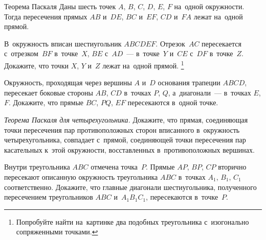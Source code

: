 


\begin{claim}{Теорема Паскаля}
Даны шесть точек $A$, $B$, $C$, $D$, $E$, $F$ на~одной окружности.
Тогда пересечения прямых $AB$ и~$DE$, $BC$ и~$EF$, $CD$ и~$FA$ лежат на~одной
прямой.
\end{claim}

\begin{problems}

\item
В~окружность вписан шестиугольник $ABCDEF$.
Отрезок~$AC$ пересекается с~отрезком~$BF$ в~точке~$X$,
$BE$ с~$AD$~--- в~точке~$Y$ и~$CE$ с~$DF$ в~точке~$Z$.
Докажите, что точки $X$, $Y$ и~$Z$ лежат на~одной прямой.%
\footnote{Попробуйте найти на~картинке два подобных треугольника с~изогонально
сопряженными точками.}


\item
Окружность, проходящая через вершины $A$ и~$D$ основания трапеции $ABCD$,
пересекает боковые стороны $AB$, $CD$ в~точках $P$, $Q$, а~диагонали~---
в~точках $E$, $F$.
Докажите, что прямые $BC$, $PQ$, $EF$ пересекаются в~одной точке.


\item
\emph{Теорема Паскаля для четырехугольника.}
Докажите, что прямая, соединяющая точки пересечения пар противоположных сторон
вписанного в~окружность четырехугольника, совпадает с~прямой, соединяющей точки
пересечения пар касательных к~этой окружности, восставленных в~противоположных
вершинах.

\item
Внутри треугольника $ABC$ отмечена точка~$P$.
Прямые $AP$, $BP$, $CP$ вторично пересекают описанную окружность треугольника
$ABC$ в~точках $A_{1}$, $B_{1}$, $C_{1}$ соответственно.
Докажите, что главные диагонали шестиугольника, полученного пересечением
треугольников $ABC$ и~$A_{1}B_{1}C_{1}$, пересекаются в~точке~$P$.


\end{problems}
